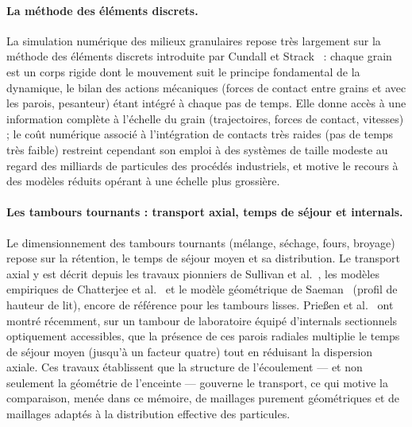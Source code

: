 \documentclass[french]{MemoireMaster}
\begin{document}
\paragraph{La méthode des éléments discrets.} La simulation numérique des milieux granulaires repose très largement sur la méthode des éléments discrets introduite par Cundall et Strack~\cite{cundall1979} : chaque grain est un corps rigide dont le mouvement suit le principe fondamental de la dynamique, le bilan des actions mécaniques (forces de contact entre grains et avec les parois, pesanteur) étant intégré à chaque pas de temps. Elle donne accès à une information complète à l'échelle du grain (trajectoires, forces de contact, vitesses) ; le coût numérique associé à l'intégration de contacts très raides (pas de temps très faible) restreint cependant son emploi à des systèmes de taille modeste au regard des milliards de particules des procédés industriels, et motive le recours à des modèles réduits opérant à une échelle plus grossière.

\paragraph{Les tambours tournants : transport axial, temps de séjour et internals.} Le dimensionnement des tambours tournants (mélange, séchage, fours, broyage) repose sur la rétention, le temps de séjour moyen et sa distribution. Le transport axial y est décrit depuis les travaux pionniers de Sullivan et al.~\cite{sullivan1927}, les modèles empiriques de Chatterjee et al.~\cite{chatterjee1983} et le modèle géométrique de Saeman~\cite{saeman1951} (profil de hauteur de lit), encore de référence pour les tambours lisses. Prie{\ss}en et al.~\cite{priessen2021} ont montré récemment, sur un tambour de laboratoire équipé d'internals sectionnels optiquement accessibles, que la présence de ces parois radiales multiplie le temps de séjour moyen (jusqu'à un facteur quatre) tout en réduisant la dispersion axiale. Ces travaux établissent que la structure de l'écoulement --- et non seulement la géométrie de l'enceinte --- gouverne le transport, ce qui motive la comparaison, menée dans ce mémoire, de maillages purement géométriques et de maillages adaptés à la distribution effective des particules.
\end{document}

